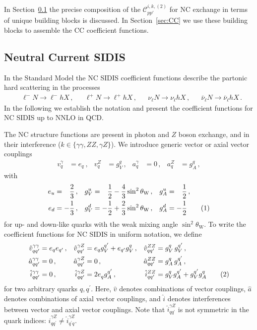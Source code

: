 \documentclass[11pt,a4paper]{article}
\newcommand{\Ccal}{\mathcal{C}}
\newcommand{\qp}{{q^\prime}}
\newcommand{\NC}{\mathrm{NC}}
\newcommand{\CC}{\mathrm{CC}}
\newcommand{\vh}{\hat{v}}
\newcommand{\ah}{\hat{a}}
\newcommand{\ih}{\hat{i}}
\newcommand\numberthis{\addtocounter{equation}{1}\tag{\theequation}}
\begin{document}
In Section~\ref{sec:NC} the precise composition of the $\Ccal^{i,k,(2)}_{p p'}$ for $\NC$ exchange in terms of unique building blocks is discussed.
In Section~\ref{sec:CC} we use these building blocks to assemble the $\CC$ coefficient functions.

\subsection{Neutral Current SIDIS}
\label{sec:NC}

In the Standard Model the $\NC$ SIDIS coefficient functions describe the partonic hard scattering in the processes
\begin{align}
& \ell^- N \to \ell^- h X\, , & & \ell^+ N \to \ell^+ h X \, , & &  \nu_\ell N \to \nu_\ell h X \, , & & \bar{\nu}_\ell N \to \bar{\nu}_\ell h X\,.
\end{align}
In the following we establish the notation and present the coefficient functions for NC SIDIS up to NNLO in QCD.

The $\NC$ structure functions are present in photon and $Z$ boson exchange, and in their interference ($k\in\{\gamma \gamma , ZZ ,\gamma Z\}$).
We introduce generic vector or axial vector couplings
\begin{align}
v^{\gamma}_q &=e_q^{\phantom{\gamma}} \,, & v^{Z}_q &= g^q_V \,, &
a^{\gamma}_q &=0\,, & a^{Z}_q &= g^q_A\,,
\end{align}
with
\begin{align*}
e_u &= \phantom{+}\frac{2}{3}\, , &
%
g^u_V &= \phantom{+}\frac{1}{2} - \frac{4}{3}\sin^2\theta_\mathrm{W} \, , &
%
g^u_A &= \phantom{+}\frac{1}{2} \, , \\
%
e_d &= -\frac{1}{3} \, , &
%
g^d_V &= -\frac{1}{2} + \frac{2}{3}\sin^2\theta_\mathrm{W} \, ,&
%
g^d_A &= -\frac{1}{2} \numberthis
\end{align*}
for up- and down-like quarks with the weak mixing angle $\sin^2 \theta_\mathrm{W}$.
To write the coefficient functions for $\NC$ SIDIS in uniform notation, we define
\begin{align*}
\vh^{\gamma\gamma}_{q\qp} &=e_q e_\qp \,, & \vh^{\gamma Z}_{q\qp} &= e_q g_V^{\qp} + e_\qp g_V^q \, , & \vh^{ZZ}_{q\qp} &= g^q_V\, g^{\qp}_V\,, \\
%
\ah^{\gamma\gamma}_{q\qp} &=0\,, & \ah_{q\qp}^{\gamma Z} &= 0 \, , & \ah^{ZZ}_{q\qp} &= g^q_A \, g^{\qp}_A \,, \\
%
\ih^{\gamma\gamma}_{q\qp} &=0\,, & \ih^{\gamma Z}_{q\qp} &= 2 e_q^{\phantom{q}} g^{\qp}_A\,,  & \ih^{ZZ}_{q\qp} &= g^q_V g^{\qp}_A + g^{\qp}_V g^q_A  \numberthis
\label{eq:couplings}
\end{align*}
for two arbitrary quarks $q,\qp$.
Here, $\vh$ denotes combinations of vector couplings, $\ah$ denotes combinations of axial vector couplings, and $\ih$ denotes interferences between vector and axial vector couplings.
Note that $\ih_{q\qp}^{\gamma Z}$ is not symmetric in the quark indices: $\ih_{q\qp}^{\gamma Z}\neq \ih_{\qp q}^{\gamma Z}$.
\end{document}
